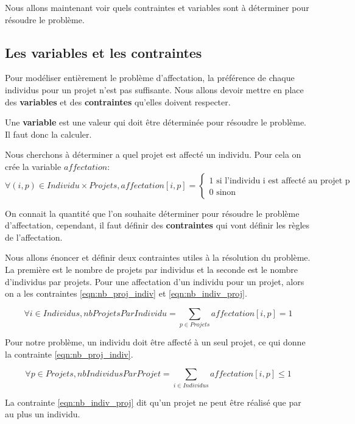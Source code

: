 \documentclass[final,poster]{polytech/polytech}
\begin{document}
Nous allons maintenant voir quels contraintes et variables sont à déterminer pour résoudre le problème.

\subsection{Les variables et les contraintes}

Pour modéliser entièrement le problème d'affectation, la préférence de chaque individus pour un projet n'est pas suffisante.
Nous allons devoir mettre en place des \textbf{ variables} et des \textbf{contraintes} qu'elles doivent respecter.

Une \textbf{variable} est une valeur qui doit être déterminée pour résoudre le problème. Il faut donc la calculer.

Nous cherchons à déterminer a quel projet est affecté un individu. Pour cela on crée la variable $affectation$:
$$
\forall (i,p) \in Individu\times Projets , affectation[i,p]=
\left\lbrace
\begin{array}{l}
1 \text{ si l'individu i est affecté au projet p} \\
0 \text{ sinon}
\end{array}
\right.
$$

On connait la quantité que l'on souhaite déterminer pour résoudre le problème d'affectation, cependant, il faut définir des \textbf{contraintes} qui vont définir les règles de l'affectation.

Nous allons énoncer et définir deux contraintes utiles à la résolution du problème. La première est le nombre de projets par individus et la seconde est le nombre d'individus par projets.
Pour une affectation d'un individu pour un projet, alors on a les contraintes \eqref{eqn:nb_proj_indiv} et \eqref{eqn:nb_indiv_proj}.

\begin{equation}
\label{eqn:nb_proj_indiv}
\forall i \in Individus, nbProjetsParIndividu= \sum_{p \in Projets} affectation[i,p] = 1
\end{equation}

Pour notre problème, un individu doit être affecté à un seul projet, ce qui donne la contrainte \eqref{eqn:nb_proj_indiv}.

\begin{equation}
\label{eqn:nb_indiv_proj}
\forall p \in Projets, nbIndividusParProjet= \sum_{i \in Individus} affectation[i,p] \leqslant 1
\end{equation}

La contrainte \eqref{eqn:nb_indiv_proj} dit qu'un projet ne peut être réalisé que par au plus un individu.
\end{document}
